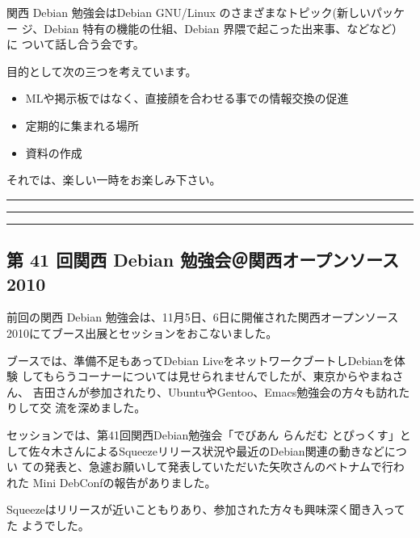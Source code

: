 \documentclass[mingoth,a4paper]{jsarticle}
\begin{document}
関西 Debian 勉強会はDebian GNU/Linux のさまざまなトピック(新しいパッケー
ジ、Debian 特有の機能の仕組、Debian 界隈で起こった出来事、などなど）に
ついて話し合う会です。

目的として次の三つを考えています。
\begin{itemize}
      \item MLや掲示板ではなく、直接顔を合わせる事での情報交換の促進
      \item 定期的に集まれる場所
      \item 資料の作成
\end{itemize}

それでは、楽しい一時をお楽しみ下さい。

\clearpage

\begin{minipage}[b]{0.2\hsize}
 {}
\end{minipage}
\begin{minipage}[b]{0.8\hsize}
\hrule
\vspace{2mm}
\hrule
\setcounter{tocdepth}{1}
\tableofcontents
\vspace{2mm}
\hrule
\end{minipage}


\subsection{第 41 回関西 Debian 勉強会＠関西オープンソース2010}

前回の関西 Debian 勉強会は、11月5日、6日に開催された関西オープンソース
2010にてブース出展とセッションをおこないました。

ブースでは、準備不足もあってDebian LiveをネットワークブートしDebianを体験
してもらうコーナーについては見せられませんでしたが、東京からやまねさん、
吉田さんが参加されたり、UbuntuやGentoo、Emacs勉強会の方々も訪れたりして交
流を深めました。

セッションでは、第41回関西Debian勉強会「でびあん らんだむ とぴっくす」と
して佐々木さんによるSqueezeリリース状況や最近のDebian関連の動きなどについ
ての発表と、急遽お願いして発表していただいた矢吹さんのベトナムで行われた
Mini DebConfの報告がありました。

Squeezeはリリースが近いこともりあり、参加された方々も興味深く聞き入ってた
ようでした。
\end{document}
